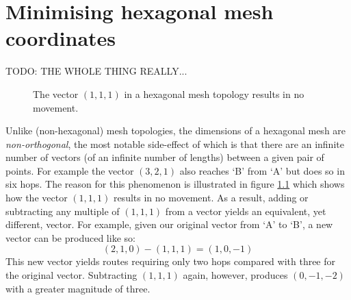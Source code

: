 \chapter{Minimising hexagonal mesh coordinates}
	\label{app:minimal-hex-coordinates}
	
	TODO: THE WHOLE THING REALLY...
	
	\begin{figure}
		\center
		\caption[$(1,1,1)$ in a hexagonal mesh or torus.]%
		{The vector $(1, 1, 1)$ in a hexagonal mesh topology results in
		no movement.}
		\label{fig:hex-mesh-loop}
	\end{figure}
	
	Unlike (non-hexagonal) mesh topologies, the dimensions of a hexagonal
	mesh are \emph{non-orthogonal}, the most notable side-effect of which is
	that there are an infinite number of vectors (of an infinite number of
	lengths) between a given pair of points. For example the vector $(3, 2,
	1)$ also reaches `B' from `A' but does so in six hops. The reason for
	this phenomenon is illustrated in figure \ref{fig:hex-mesh-loop} which
	shows how the vector $(1, 1, 1)$ results in no movement. As a result,
	adding or subtracting any multiple of $(1, 1, 1)$ from a vector yields an
	equivalent, yet different, vector. For example, given our original vector
	from `A' to `B', a new vector can be produced like so:
	\begin{equation} (2, 1, 0) - (1, 1, 1) = (1, 0, -1) \end{equation}
	This new vector yields routes requiring only two hops compared with three
	for the original vector. Subtracting $(1, 1, 1)$ again, however, produces
	$(0, -1, -2)$ with a greater magnitude of three.

